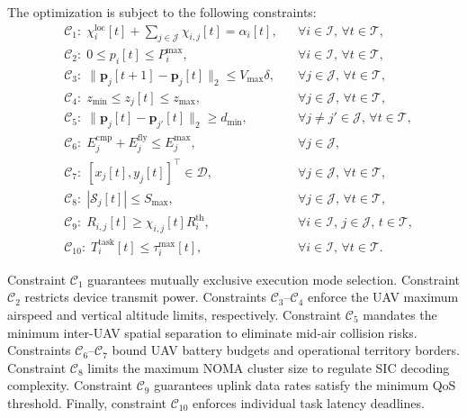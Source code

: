 \documentclass[journal]{IEEEtran}
\begin{document}
The optimization is subject to the following constraints:
\begin{align}
&\mathcal{C}_1:\; \chi_i^{\mathrm{loc}}[t] + \sum_{j \in \mathcal{J}} \chi_{i,j}[t] = \alpha_i[t], && \forall i \in \mathcal{I}, \, \forall t \in \mathcal{T}, \label{eq:c1}\\
&\mathcal{C}_2:\; 0 \le p_i[t] \le P_i^{\max}, && \forall i \in \mathcal{I}, \, \forall t \in \mathcal{T}, \label{eq:c2}\\
&\mathcal{C}_3:\; \|\mathbf{p}_j[t+1] - \mathbf{p}_j[t]\|_2 \le V_{\max} \delta, && \forall j \in \mathcal{J}, \, \forall t \in \mathcal{T}, \label{eq:c3}\\
&\mathcal{C}_4:\; z_{\min} \le z_j[t] \le z_{\max}, && \forall j \in \mathcal{J}, \, \forall t \in \mathcal{T}, \label{eq:c4}\\
&\mathcal{C}_5:\; \|\mathbf{p}_j[t] - \mathbf{p}_{j'}[t]\|_2 \ge d_{\min}, && \forall j \neq j' \in \mathcal{J}, \, \forall t \in \mathcal{T}, \label{eq:c5}\\
&\mathcal{C}_6:\; E_j^{\mathrm{cmp}} + E_j^{\mathrm{fly}} \le E_j^{\max}, && \forall j \in \mathcal{J}, \label{eq:c6}\\
&\mathcal{C}_7:\; [x_j[t], y_j[t]]^\top \in \mathcal{D}, && \forall j \in \mathcal{J}, \, \forall t \in \mathcal{T}, \label{eq:c7}\\
&\mathcal{C}_8:\; |\mathcal{S}_j[t]| \le S_{\max}, && \forall j \in \mathcal{J}, \, \forall t \in \mathcal{T}, \label{eq:c8}\\
&\mathcal{C}_9:\; R_{i,j}[t] \ge \chi_{i,j}[t] R_i^{\mathrm{th}}, && \forall i \in \mathcal{I}, \, j \in \mathcal{J}, \, t \in \mathcal{T}, \label{eq:c9}\\
&\mathcal{C}_{10}:\; T_i^{\mathrm{task}}[t] \le \tau_i^{\max}[t], && \forall i \in \mathcal{I}, \, \forall t \in \mathcal{T}. \label{eq:c10}
\end{align}

Constraint $\mathcal{C}_1$ guarantees mutually exclusive execution mode selection. Constraint $\mathcal{C}_2$ restricts device transmit power. Constraints $\mathcal{C}_3$--$\mathcal{C}_4$ enforce the UAV maximum airspeed and vertical altitude limits, respectively. Constraint $\mathcal{C}_5$ mandates the minimum inter-UAV spatial separation to eliminate mid-air collision risks. Constraints $\mathcal{C}_6$--$\mathcal{C}_7$ bound UAV battery budgets and operational territory borders. Constraint $\mathcal{C}_8$ limits the maximum NOMA cluster size to regulate SIC decoding complexity. Constraint $\mathcal{C}_9$ guarantees uplink data rates satisfy the minimum QoS threshold. Finally, constraint $\mathcal{C}_{10}$ enforces individual task latency deadlines.
\end{document}
